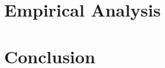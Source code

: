 \documentclass[12pt]{article} %
\begin{document}
\section{Empirical Analysis}

\section{Conclusion}
	
\newpage	
\footnotesize


\end{document}
